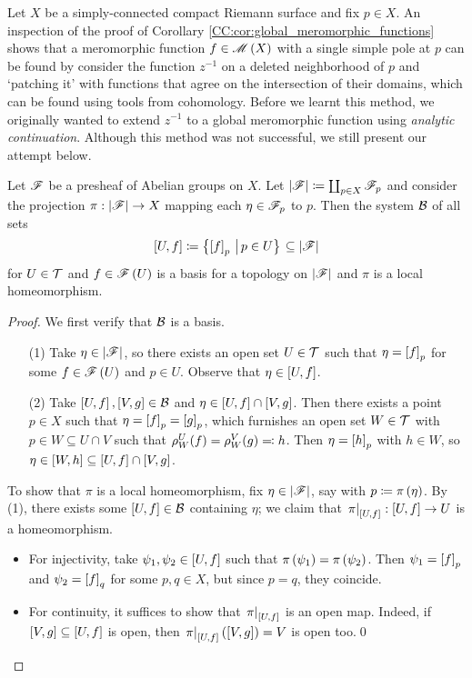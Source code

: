 \documentclass[../Moduli_Spaces_of_Riemann_Surfaces.tex]{subfiles}
\begin{document}
    Let $X$ be a simply-connected compact Riemann surface and fix $p\in X$. An inspection of the proof of Corollary \ref{CC:cor:global_meromorphic_functions} shows that a meromorphic function $f\in\mathscr{M}\left(X\right)$ with a single simple pole at $p$ can be found by consider the function $z^{-1}$ on a deleted neighborhood of $p$ and `patching it' with functions that agree on the intersection of their domains, which can be found using tools from cohomology. Before we learnt this method, we originally wanted to extend $z^{-1}$ to a global meromorphic function using \textit{analytic continuation}. Although this method was not successful, we still present our attempt below.
    \begin{proposition}\label{A:prp:basis_stalk}
        Let $\mathscr{F}$ be a presheaf of Abelian groups on $X$. Let $\left|\mathscr{F}\right|\coloneqq\coprod_{p\in X}\mathscr{F}_p$ and consider the projection $\pi:\left|\mathscr{F}\right|\to X$ mapping each $\eta\in\mathscr{F}_p$ to $p$. Then the system $\mathcal{B}$ of all sets
        \begin{equation*}
            \left[U,f\right]\coloneqq\bigl\{\left[f\right]_p\,\left|\,p\in U\bigr\}\right.\subseteq\left|\mathscr{F}\right|
        \end{equation*}
        for $U\in\mathcal{T}$ and $f\in\mathscr{F}\left(U\right)$ is a basis for a topology on $\left|\mathscr{F}\right|$ and $\pi$ is a local homeomorphism.
    \end{proposition}
    \begin{proof}
        We first verify that $\mathcal{B}$ is a basis.
        \begin{enumerate}
            \item[(1)] Take $\eta\in\left|\mathscr{F}\right|$, so there exists an open set $U\in\mathcal{T}$ such that $\eta=\left[f\right]_p$ for some $f\in\mathscr{F}\left(U\right)$ and $p\in U$. Observe that $\eta\in\left[U,f\right]$.
            \item[(2)] Take $\left[U,f\right],\left[V,g\right]\in\mathcal{B}$ and $\eta\in\left[U,f\right]\cap\left[V,g\right]$. Then there exists a point $p\in X$ such that $\eta=\left[f\right]_p=\left[g\right]_p$, which furnishes an open set $W\in\mathcal{T}$ with $p\in W\subseteq U\cap V$ such that $\rho^U_W\!\left(f\right)=\rho^V_W\!\left(g\right)\eqqcolon h$. Then $\eta=\left[h\right]_p$ with $h\in W$, so $\eta\in\left[W,h\right]\subseteq\left[U,f\right]\cap\left[V,g\right]$.
        \end{enumerate}
        To show that $\pi$ is a local homeomorphism, fix $\eta\in\left|\mathscr{F}\right|$, say with $p\coloneqq\pi\left(\eta\right)$. By (1), there exists some $\left[U,f\right]\in\mathcal{B}$ containing $\eta$; we claim that $\left.\pi\right|_{\left[U,f\right]}:\left[U,f\right]\to U$ is a homeomorphism.
        \begin{itemize}
            \item For injectivity, take $\psi_1,\psi_2\in\left[U,f\right]$ such that $\pi\left(\psi_1\right)=\pi\left(\psi_2\right)$. Then $\psi_1=\left[f\right]_p$ and $\psi_2=\left[f\right]_q$ for some $p,q\in X$, but since $p=q$, they coincide.
            \item For continuity, it suffices to show that $\left.\pi\right|_{\left[U,f\right]}$ is an open map. Indeed, if $\left[V,g\right]\subseteq\left[U,f\right]$ is open, then $\left.\pi\right|_{\left[U,f\right]}\left(\left[V,g\right]\right)=V$ is open too.\qed
        \end{itemize}
    \end{proof}
\end{document}
